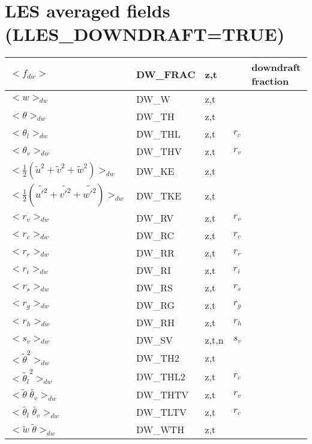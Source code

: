 \section{LES averaged fields (LLES\_DOWNDRAFT=TRUE)}

\begin{center}
\begin{tabular}{||p{6cm}|>{\centering}p{2.5cm}|>{\centering}p{1.5cm}|>{\centering}p{1cm}|p{4cm }||}
\hline
\hline
$<f_{dw}>$ & DW\_FRAC & z,t & & downdraft fraction \\
\hline
$<w>_{dw}$ & DW\_W & z,t & & \\
\hline
$<\theta>_{dw}$& DW\_TH & z,t & & \\
\hline
$<\theta_l>_{dw}$& DW\_THL & z,t & $r_c$ & \\
\hline
$<\theta_v>_{dw}$& DW\_THV & z,t & $r_v$ & \\
\hline
$<\frac{1}{2}(\tilde{u}^2+\tilde{v}^2+\tilde{w}^2)>_{dw}$ & DW\_KE & z,t & & \\
\hline
$<\frac{1}{2}(\tilde{u'^2}+\tilde{v'^2}+\tilde{w'^2})>_{dw}$ & DW\_TKE & z,t & & \\
\hline
$<r_v>_{dw}$ & DW\_RV & z,t & $r_v$ & \\
\hline
$<r_c>_{dw}$& DW\_RC & z,t & $r_c$ & \\
\hline
$<r_r>_{dw}$& DW\_RR & z,t & $r_r$ & \\
\hline
$<r_i>_{dw}$ & DW\_RI & z,t & $r_i$ & \\
\hline
$<r_s>_{dw}$& DW\_RS & z,t & $r_s$ & \\
\hline
$<r_g>_{dw}$ & DW\_RG & z,t & $r_g$ & \\
\hline
$<r_h>_{dw}$ & DW\_RH & z,t & $r_h$ & \\
\hline
$<s_v>_{dw}$ & DW\_SV & z,t,n & $s_v$ & \\
\hline
$<{\tilde{\theta}^2}>_{dw}$ & DW\_TH2 & z,t &  & \\
\hline
$<{\tilde{\theta_l}^2}>_{dw}$& DW\_THL2 & z,t & $r_c$ & \\
\hline
$<{\tilde{\theta}\;\tilde{\theta_v}}>_{dw}$ & DW\_THTV & z,t & $r_v$ & \\
\hline
$<{\tilde{\theta_l}\;\tilde{\theta_v}}>_{dw}$ & DW\_TLTV & z,t & $r_c$ & \\
\hline
$<{\tilde{w}\;\tilde{\theta}}>_{dw}$ & DW\_WTH & z,t & & \\

\end{tabular}
\end{center}
